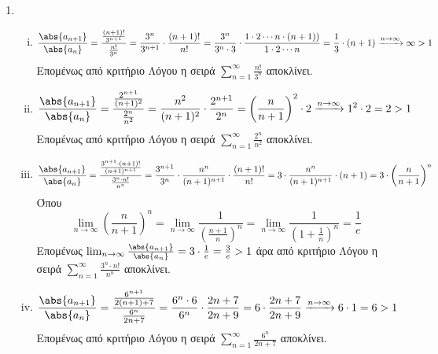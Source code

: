 \begin{enumerate}
\begin{enumerate}[i)]
    \end{enumerate} 

  \item 
    \begin{enumerate}[i)]
      \item 
        \[
          \frac{\abs{a_{n+1}}}{\abs{a_{n}}} = 
          \frac{\frac{(n+1)!}{3^{n+1}}}{\frac{n!}{3^{n}}} = 
          \frac{3^{n}}{3^{n+1}} \cdot
          \frac{(n+1)!}{n!} = \frac{3^{n}}{3^{n}\cdot 3} \cdot \frac{1 \cdot 2 
          \cdots n \cdot (n+1))}{1 \cdot 2 \cdots n} = \frac{1}{3} \cdot (n+1) 
          \xrightarrow{n \to \infty} \infty > 1
        \] 
        Επομένως από κριτήριο Λόγου η σειρά $ \sum_{n=1}^{\infty} 
        \frac{n!}{3^{n}}$ αποκλίνει. 

      \item 
        \[
          \frac{\abs{a_{n+1}}}{\abs{a_{n}}} = \frac{\frac{2^{n+1}}{(n+1)^{2}}}{
          \frac{2^{n}}{n^{2}}} = \frac{n^{2}}{(n+1)^{2}} \cdot 
          \frac{2^{n+1}}{2^{n}} =  \left(\frac{n}{n+1}\right)^{2} \cdot 2 
          \xrightarrow{n \to \infty} 1^{2}\cdot 2 = 2 > 1 
        \] 
        Επομένως από κριτήριο Λόγου η σειρά $ \sum_{n=1}^{\infty} 
        \frac{2^{n}}{n^{2}} $ αποκλίνει.

      \item 
        \[
          \frac{\abs{a_{n+1}}}{\abs{a_{n}}} = \frac{\frac{3^{n+1}\cdot (n+1)!}
          {(n+1)^{n+1}}}{\frac{3^{n}\cdot n!}{n^{n}}} = \frac{3^{n+1}}{3^{n}} 
          \cdot \frac{n^{n}}{(n+1)^{n+1}} \cdot \frac{(n+1)!}{n!} = 3 \cdot 
          \frac{n^{n}}{(n+1)^{n+1}} \cdot (n+1) = 3 \cdot \left(\frac{n}{n+1} 
          \right)^{n} 
        \] 
        Όπου 
        \[
          \lim_{n \to \infty} \left(\frac{n}{n+1} \right)^{n} = 
          \lim_{n \to \infty}\frac{1}{\left(\frac{n+1}{n}\right)^{n}} = 
          \lim_{n \to \infty} \frac{1}{(1 + \frac{1}{n})^{n}} = \frac{1}{e}
        \]
        Επομένως $ \lim_{n \to \infty} \frac{\abs{a_{n+1}}}{\abs{a_{n}}} = 
        3 \cdot \frac{1}{e} = \frac{3}{e} > 1$ άρα από κριτήριο Λόγου η σειρά 
        $ \sum_{n=1}^{\infty} \frac{3^{n}\cdot n!}{n^{n}} $ αποκλίνει.

      \item 
        \[
          \frac{\abs{a_{n+1}}}{\abs{a_{n}}} = \frac{\frac{6^{n+1}}{2(n+1)+7}}
          {\frac{6^{n}}{2n+7}} = \frac{6^{n}\cdot 6}{6^{n}} \cdot 
          \frac{2n+7}{2n+9} = 6 \cdot \frac{2n+7}{2n+9} 
          \xrightarrow{n \to \infty} 6 \cdot 1 = 6>1
        \] 
        Επομένως από κριτήριο Λόγου η σειρά 
        $ \sum_{n=1}^{\infty} \frac{6^{n}}{2n+7} $ αποκλίνει.


\end{enumerate}
\end{enumerate}
